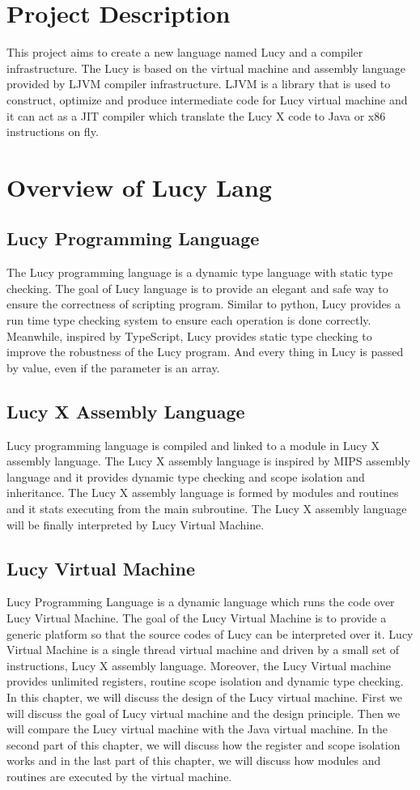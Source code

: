 \section{Project Description}
This project aims to create a new language named Lucy and a compiler infrastructure. The Lucy is based on the virtual machine and assembly language provided by LJVM compiler infrastructure. LJVM is a library that is used to construct, optimize and produce intermediate code for Lucy virtual machine and it can act as a JIT compiler which translate the Lucy X code to Java or x86 instructions on fly.

\section{Overview of Lucy Lang}
\subsection{Lucy Programming Language}
The Lucy programming language is a dynamic type language with static type checking. The goal of Lucy language is to provide an elegant and safe way to ensure the correctness of scripting program. Similar to python, Lucy provides a run time type checking system to ensure each operation is done correctly. Meanwhile, inspired by TypeScript, Lucy provides static type checking to improve the robustness of the Lucy program. And every thing in Lucy is passed by value, even if the parameter is an array.

\subsection{Lucy X Assembly Language}
Lucy programming language is compiled and linked to a module in Lucy X assembly language. The Lucy X assembly language is inspired by MIPS assembly language and it provides dynamic type checking and scope isolation and inheritance. The Lucy X assembly language is formed by modules and routines and it stats executing from the main subroutine. The Lucy X assembly language will be finally interpreted by Lucy Virtual Machine.

\subsection{Lucy Virtual Machine}
Lucy Programming Language is a dynamic language which runs the code over Lucy Virtual Machine. The goal of the Lucy Virtual Machine is to provide a generic platform so that the source codes of Lucy can be interpreted over it. Lucy Virtual Machine is a single thread virtual machine and driven by a small set of instructions, Lucy X assembly language. Moreover, the Lucy Virtual machine provides unlimited registers, routine scope isolation and dynamic type checking. In this chapter, we will discuss the design of the Lucy virtual machine. First we will discuss the goal of Lucy virtual machine and the design principle. Then we will compare the Lucy virtual machine with the Java virtual machine. In the second part of this chapter, we will discuss how the register and scope isolation works and in the last part of this chapter, we will discuss how modules and routines are executed by the virtual machine.

